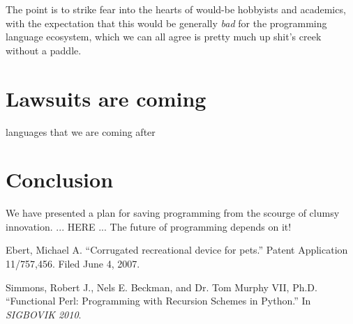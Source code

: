 \documentclass[acmtocl]%
{boviktrans}
\begin{document}
The point is to strike fear into the hearts of would-be hobbyists and
academics, with the expectation that this would be generally {\it bad}
for the programming language ecosystem, which we can all agree is
pretty much up shit's creek without a paddle.


\section{Lawsuits are coming}

languages that we are coming after


\section{Conclusion}

We have presented a plan for saving programming from the scourge of clumsy innovation. 
... HERE ...
The future of programming depends on it!

\begin{thebibliography}{1}


Ebert, Michael A.
\newblock ``Corrugated recreational device for pets.''
\newblock Patent Application 11/757,456.
\newblock Filed June 4, 2007.

Simmons, Robert J., Nels E. Beckman, and Dr. Tom Murphy VII, Ph.D.
\newblock ``Functional Perl: Programming with Recursion Schemes in Python.''
\newblock In {\it SIGBOVIK 2010}.

\end{thebibliography}
\end{document}
